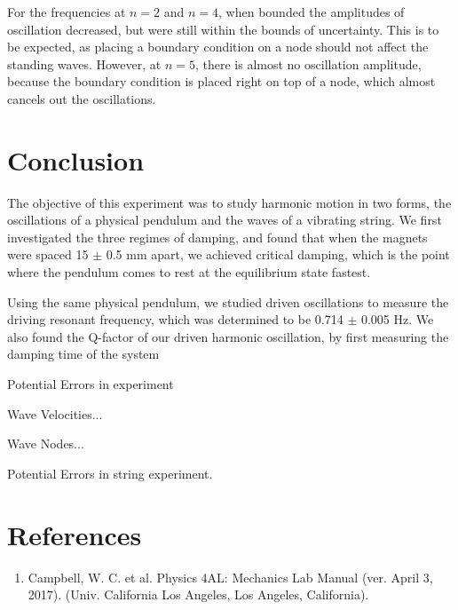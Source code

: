 \documentclass[11pt]{report}
\begin{document}
For the frequencies at $n=2$ and $n=4$, when bounded the amplitudes of
oscillation decreased, but were still within the bounds of uncertainty.  This is
to be expected, as placing a boundary condition on a node should not affect the
standing waves.  However, at $n=5$, there is almost no oscillation amplitude,
because the boundary condition is placed right on top of a node, which almost
cancels out the oscillations.

\section*{Conclusion}

The objective of this experiment was to study harmonic motion in two forms, the
oscillations of a physical pendulum and the waves of a vibrating string.  We
first investigated the three regimes of damping, and found that when the magnets
were spaced 15 $\pm$ 0.5 mm apart, we achieved critical damping, which is the point where
the pendulum comes to rest at the equilibrium state fastest.  

Using the same physical pendulum, we studied driven oscillations to measure the
driving resonant frequency, which was determined to be 0.714 $\pm$ 0.005 Hz.  We
also found the Q-factor of our driven harmonic oscillation, by first measuring
the damping time of the system

Potential Errors in experiment

Wave Velocities...

Wave Nodes...

Potential Errors in string experiment.


\section*{References}
\begin{enumerate}
    \item Campbell, W. C. et al. Physics 4AL: Mechanics Lab Manual (ver. April
        3, 2017). (Univ. California Los Angeles, Los Angeles, California).
\end{enumerate}
\end{document}
